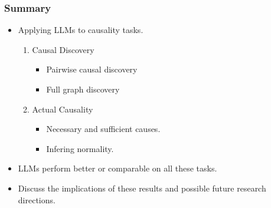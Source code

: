 \documentclass{beamer}
\begin{document}
\begin{frame}
	\frametitle{Summary}
	\begin{itemize}
		\item Applying LLMs to causality tasks.
		\begin{enumerate}
			\item Causal Discovery
				\begin{itemize}
					\item Pairwise causal discovery
					\item Full graph discovery
				\end{itemize}
			\item Actual Causality
				\begin{itemize}
					\item Necessary and sufficient causes.
					\item Infering normality.
				\end{itemize}
		\end{enumerate}
		\item LLMs perform better or comparable on all these tasks. 
		\item Discuss the implications of these results and possible
			future research directions.
	\end{itemize}
\end{frame}
\end{document}
